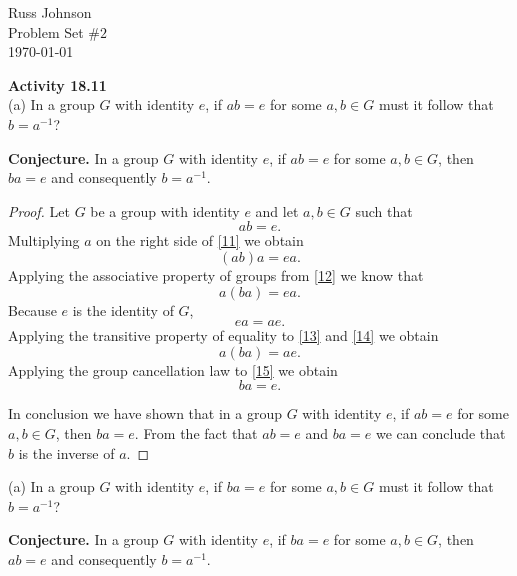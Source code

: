 \documentclass[11pt,a4paper]{article}
\begin{document}
\begin{flushright}
Russ Johnson\\
Problem Set $\#2$\\
\today\\
\end{flushright}

{\bf Activity 18.11}\\
(a) In a group $G$ with identity $e$, if $ab = e$ for some $a, b \in G$ must it follow
that $b = a^{-1}$?

{\bf Conjecture. } In a group $G$ with identity $e$, if $ab = e$ for some $a, b \in G$, then $ba = e$ and consequently $b = a^{-1}$.

\begin{proof}
Let $G$ be a group with identity $e$ and let $a,b \in G$ such that
\begin{equation}\label{11}
ab = e.
\end{equation}
Multiplying $a$ on the right side of \eqref{11} we obtain
\begin{equation}\label{12}
(ab)a = ea.
\end{equation}
Applying the associative property of groups from \eqref{12} we know that
\begin{equation}\label{13}
a(ba) = ea.
\end{equation}
Because $e$ is the identity of $G$,
\begin{equation}\label{14}
ea = ae.
\end{equation}
Applying the transitive property of equality to \eqref{13} and \eqref{14} we obtain
\begin{equation}\label{15}
a(ba) = ae.
\end{equation}
Applying the group cancellation law to \eqref{15} we obtain
\begin{equation}
ba = e.
\end{equation}

In conclusion we have shown that in a group $G$ with identity $e$, if $ab = e$ for some $a, b \in G$, then $ba = e$. From the fact that $ab = e$ and $ba = e$ we can conclude that $b$ is the inverse of $a$.
\end{proof}

(a) In a group $G$ with identity $e$, if $ba = e$ for some $a, b \in G$ must it follow
that $b = a^{-1}$?

{\bf Conjecture. } In a group $G$ with identity $e$, if $ba = e$ for some $a, b \in G$, then $ab = e$ and consequently $b = a^{-1}$.
\end{document}
